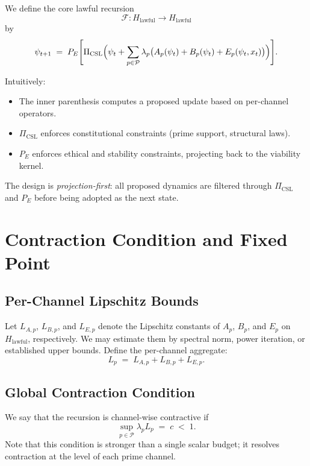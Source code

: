 \documentclass[11pt]{article}
\begin{document}
We define the core lawful recursion
\begin{equation}
  \label{eq:F-def}
  \mathcal{F} : H_{\text{lawful}} \to H_{\text{lawful}}
\end{equation}
by
\begin{equation}
  \psi_{t+1}
  \;=\;
  P_E \Biggl[
    \Pi_{\text{CSL}} \Bigl(
      \psi_t + \sum_{p \in \mathcal{P}} \lambda_p \bigl( A_p(\psi_t) + B_p(\psi_t) + E_p(\psi_t, x_t) \bigr)
    \Bigr)
  \Biggr].
\end{equation}

Intuitively:
\begin{itemize}[leftmargin=1.5em]
  \item The inner parenthesis computes a proposed update based on per-channel operators.
  \item $\Pi_{\text{CSL}}$ enforces constitutional constraints (prime support, structural laws).
  \item $P_E$ enforces ethical and stability constraints, projecting back to the viability kernel.
\end{itemize}
The design is \emph{projection-first}: all proposed dynamics are filtered through $\Pi_{\text{CSL}}$ and $P_E$ before being adopted as the next state.

\section{Contraction Condition and Fixed Point}
\label{sec:contraction}

\subsection{Per-Channel Lipschitz Bounds}

Let $L_{A,p}$, $L_{B,p}$, and $L_{E,p}$ denote the Lipschitz constants of $A_p$, $B_p$, and $E_p$ on $H_{\text{lawful}}$, respectively.
We may estimate them by spectral norm, power iteration, or established upper bounds.
Define the per-channel aggregate:
\begin{equation}
  L_p \;=\; L_{A,p} + L_{B,p} + L_{E,p}.
\end{equation}

\subsection{Global Contraction Condition}

We say that the recursion is channel-wise contractive if
\begin{equation}
  \label{eq:contraction-condition}
  \sup_{p \in \mathcal{P}} \lambda_p L_p \;=\; c \;<\; 1.
\end{equation}
Note that this condition is stronger than a single scalar budget; it resolves contraction at the level of each prime channel.
\end{document}
